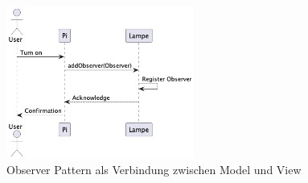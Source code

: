 \documentclass[../vs-script-first-v01.tex]{subfiles}
\begin{document}
\begin{figure}[ht]
  \centering
  \includegraphics[width=0.55\textwidth]{fig/uml/seq-mvc-observer.png}
  \caption{Observer Pattern als Verbindung zwischen Model und View}
  \label{fig:seq-mvc-observer}
\end{figure}
\end{document}
